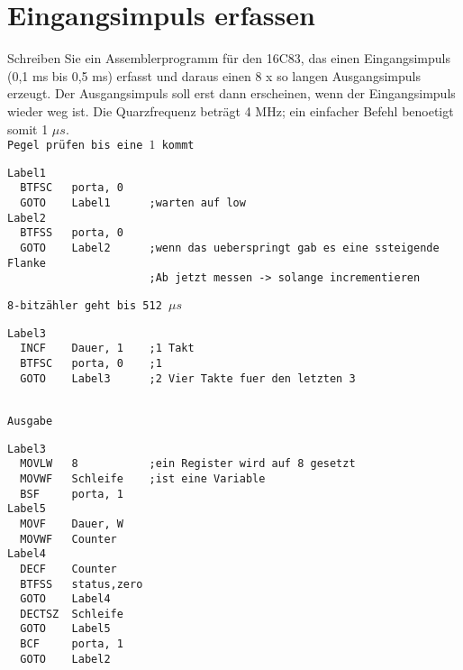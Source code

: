 \section*{Eingangsimpuls erfassen }
Schreiben Sie ein Assemblerprogramm für den 16C83, das einen Eingangsimpuls (0,1 ms bis 0,5
ms) erfasst und daraus einen 8 x so langen Ausgangsimpuls erzeugt. Der Ausgangsimpuls soll erst
dann erscheinen, wenn der Eingangsimpuls wieder weg ist. Die Quarzfrequenz beträgt 4 MHz; ein
einfacher Befehl benoetigt somit 1 $\mu s$.\\
\texttt{Pegel prüfen bis eine $1$ kommt}
\begin{lstlisting}[language={[mips]Assembler}]
Label1
  BTFSC   porta, 0
  GOTO    Label1      ;warten auf low
Label2
  BTFSS   porta, 0
  GOTO    Label2      ;wenn das ueberspringt gab es eine ssteigende Flanke
                      ;Ab jetzt messen -> solange incrementieren
\end{lstlisting}
\texttt{8-bitzähler geht bis 512 $\mu s$}
\begin{lstlisting}[language={[mips]Assembler}]
Label3
  INCF    Dauer, 1    ;1 Takt
  BTFSC   porta, 0    ;1
  GOTO    Label3      ;2 Vier Takte fuer den letzten 3
   
  \end{lstlisting}
  \texttt{Ausgabe}
\begin{lstlisting}[language={[mips]Assembler}]
Label3
  MOVLW   8           ;ein Register wird auf 8 gesetzt
  MOVWF   Schleife    ;ist eine Variable
  BSF     porta, 1   
Label5
  MOVF    Dauer, W
  MOVWF   Counter
Label4
  DECF    Counter
  BTFSS   status,zero
  GOTO    Label4
  DECTSZ  Schleife
  GOTO    Label5
  BCF     porta, 1
  GOTO    Label2
\end{lstlisting}